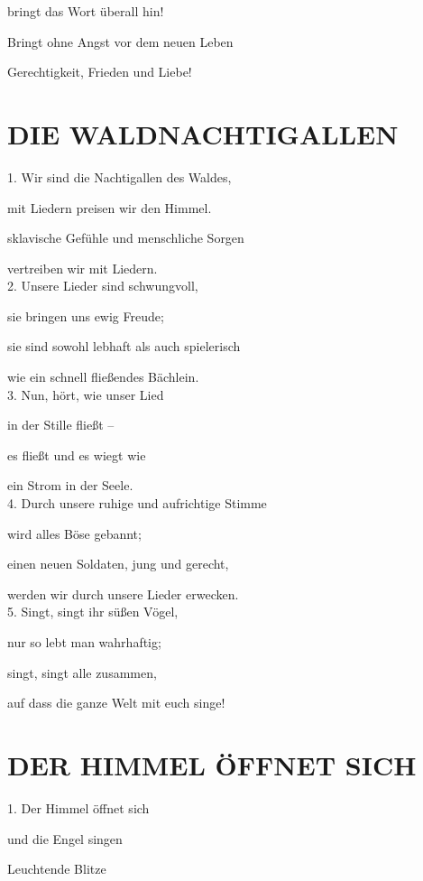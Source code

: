 \documentclass[11pt,a5paper,twoside]{article}
\begin{document}
bringt das Wort überall hin! 

Bringt ohne Angst vor dem neuen Leben 

Gerechtigkeit, Frieden und Liebe!\\

\section[Die Waldnachtigallen]{DIE WALDNACHTIGALLEN}
 
1. Wir sind die Nachtigallen des Waldes,

mit Liedern preisen wir den Himmel. 

sklavische Gefühle und menschliche Sorgen

vertreiben wir mit Liedern.\\

2. Unsere Lieder sind schwungvoll, 

sie bringen uns ewig Freude;

sie sind sowohl lebhaft als auch spielerisch

wie ein schnell fließendes Bächlein.\\

3. Nun, hört, wie unser Lied 

in der Stille fließt --

es fließt und es wiegt wie

ein Strom in der Seele.\\

4. Durch unsere ruhige und aufrichtige Stimme

wird alles Böse gebannt; 

einen neuen Soldaten, jung und gerecht, 

werden wir durch unsere Lieder erwecken.\\

5. Singt, singt ihr süßen Vögel, 

nur so lebt man wahrhaftig; 

singt, singt alle zusammen, 

auf dass die ganze Welt mit euch singe!

\section[Der Himmel öffnet sich]{DER HIMMEL ÖFFNET SICH}

1. Der Himmel öffnet sich

und die Engel singen

Leuchtende Blitze 
\end{document}

